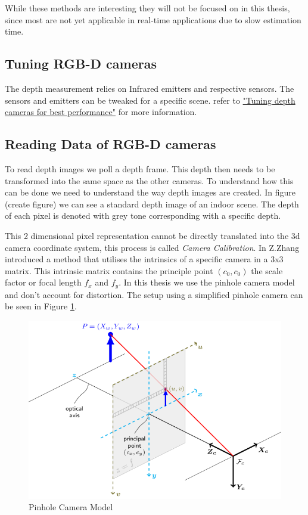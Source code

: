 While these methods are interesting they will not be focused on in this thesis, since most are not yet applicable in real-time applications due to slow estimation time.

\subsection{Tuning RGB-D cameras}

The depth measurement relies on Infrared emitters and respective sensors. The sensors and emitters can be tweaked for a specific scene. 
refer to \hyperlink{https://dev.intelrealsense.com/docs/tuning-depth-cameras-for-best-performance}{"Tuning depth cameras for best performance"} for more information.

\subsection{Reading Data of RGB-D cameras}

To read depth images we poll a depth frame. This depth then needs to be transformed into the same space as the other cameras. To understand how this can be done we need to understand the way depth images are created. In figure (create figure) we can see a standard depth image of an indoor scene. The depth of each pixel is denoted with grey tone corresponding with a specific depth. 

This 2 dimensional pixel representation cannot be directly translated into the 3d camera coordinate system, this process is called \textit{Camera Calibration}. In \cite{camera_calibration} Z.Zhang introduced a method that utilises the intrinsics of a specific camera in a 3x3 matrix. This intrinsic matrix contains the principle point $(c_0, c_0)$ the scale factor or focal length $f_x$ and $f_y$. In this thesis we use the pinhole camera model and don't account for distortion. The setup using a simplified pinhole camera can be seen in Figure \ref{fig:pinhole}.

\begin{figure}[h]
    \centering
    \includegraphics[width=.9\linewidth]{figures/CameraCalibration/pinhole_camera_model.png}
    \caption{Pinhole Camera Model}
    \label{fig:pinhole}
\end{figure}

